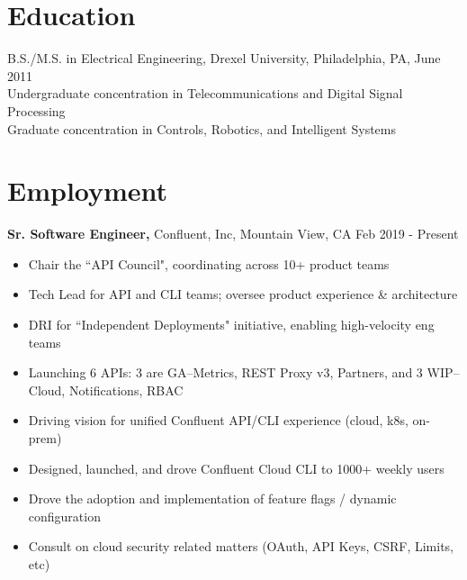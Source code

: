 \documentclass[margin]{res}
\begin{document}
 

 

\begin{resume} 


\section{Education} 
B.S./M.S. in Electrical Engineering, Drexel University, Philadelphia, PA, June 2011 \\
Undergraduate concentration in Telecommunications and Digital Signal Processing \\
Graduate concentration in Controls, Robotics, and Intelligent Systems 

\section{Employment}
{\bf Sr. Software Engineer,} Confluent, Inc, Mountain View, CA \hfill Feb 2019 - Present
\begin{itemize} \itemsep -2pt  %
  \item Chair the ``API Council", coordinating across 10+ product teams
  \item Tech Lead for API and CLI teams; oversee product experience \& architecture
  \item DRI for ``Independent Deployments" initiative, enabling high-velocity eng teams
  \item Launching 6 APIs: 3 are GA--Metrics, REST Proxy v3, Partners, and 3 WIP--Cloud, Notifications, RBAC
  \item Driving vision for unified Confluent API/CLI experience (cloud, k8s, on-prem)
  \item Designed, launched, and drove Confluent Cloud CLI to 1000+ weekly users 
  \item Drove the adoption and implementation of feature flags / dynamic configuration
  \item Consult on cloud security related matters (OAuth, API Keys, CSRF, Limits, etc)
 \end{itemize}


\end{resume}
\end{document}
